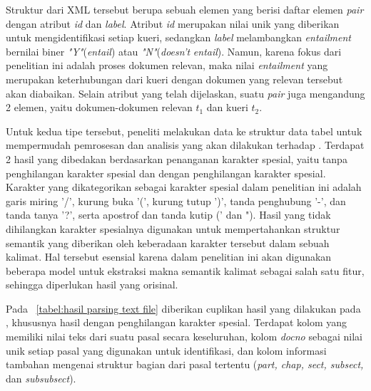 Struktur dari XML \file{} tersebut berupa sebuah elemen \dataset{} yang berisi daftar elemen \textit{pair} dengan atribut \textit{id} dan \textit{label}. Atribut \textit{id} merupakan nilai unik yang diberikan untuk mengidentifikasi setiap kueri, sedangkan \textit{label} melambangkan \textit{entailment} bernilai biner \textit{"Y"}(\textit{entail}) atau \textit{"N"}(\textit{doesn't} \textit{entail}). Namun, karena fokus dari penelitian ini adalah proses \retrieval{} dokumen relevan, maka nilai \textit{entailment} yang merupakan keterhubungan dari kueri dengan dokumen yang relevan tersebut akan diabaikan. Selain atribut yang telah dijelaskan, suatu \textit{pair} juga mengandung 2 elemen, yaitu dokumen-dokumen relevan \(t_1\) dan kueri \(t_2\).

Untuk kedua tipe \file{} tersebut, peneliti melakukan \parsing{} data ke struktur data tabel untuk mempermudah pemrosesan dan analisis yang akan dilakukan terhadap \dataset{}. Terdapat 2 hasil \parsing{} yang dibedakan berdasarkan penanganan karakter spesial, yaitu tanpa penghilangan karakter spesial dan dengan penghilangan karakter spesial. Karakter yang dikategorikan sebagai karakter spesial dalam penelitian ini adalah garis miring '/', kurung buka '(', kurung tutup ')', tanda penghubung '-', dan tanda tanya '?', serta apostrof dan tanda kutip (' dan "). Hasil \parsing{} yang tidak dihilangkan karakter spesialnya digunakan untuk mempertahankan struktur semantik yang diberikan oleh keberadaan karakter tersebut dalam sebuah kalimat. Hal tersebut esensial karena dalam penelitian ini akan digunakan beberapa model \nn{} untuk ekstraksi makna semantik kalimat sebagai salah satu fitur, sehingga diperlukan hasil \parsing{} yang orisinal.

Pada \tabel{}~\ref{tabel:hasil parsing text file} diberikan cuplikan hasil \parsing{} yang dilakukan pada \txt{} \file{}, khususnya hasil dengan penghilangan karakter spesial. Terdapat kolom \txt{} yang memiliki nilai teks dari suatu pasal secara keseluruhan, kolom \textit{docno} sebagai nilai unik setiap pasal yang digunakan untuk identifikasi, dan kolom informasi tambahan mengenai struktur bagian dari pasal tertentu (\textit{part, chap, sect, subsect,} dan \textit{subsubsect}).


